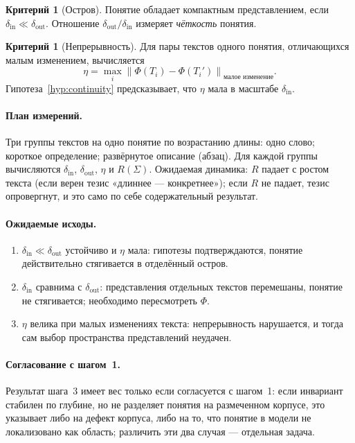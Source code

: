 \documentclass[11pt,a4paper]{article}
\theoremstyle{definition}
\newtheorem{criterion}[definition]{Критерий}
\theoremstyle{plain}
\newcommand{\norm}[1]{\left\lVert #1 \right\rVert}
\begin{document}
\begin{criterion}[Остров]
Понятие обладает компактным представлением, если $\delta_{\mathrm{in}}\ll\delta_{\mathrm{out}}$.
Отношение $\delta_{\mathrm{out}}/\delta_{\mathrm{in}}$ измеряет \emph{чёткость} понятия.
\end{criterion}

\begin{criterion}[Непрерывность]
Для пары текстов одного понятия, отличающихся малым изменением, вычисляется
\[
\eta=\max_{i}\norm{\Phi(T_i)-\Phi(T_i')}_{\text{малое изменение}}.
\]
Гипотеза~\ref{hyp:continuity} предсказывает, что $\eta$ мала в масштабе $\delta_{\mathrm{in}}$.
\end{criterion}

\paragraph{План измерений.}
Три группы текстов на одно понятие по возрастанию длины: одно слово; короткое определение;
развёрнутое описание (абзац). Для каждой группы вычисляются $\delta_{\mathrm{in}}$,
$\delta_{\mathrm{out}}$, $\eta$ и $R(\Sigma)$. Ожидаемая динамика: $R$ падает с ростом текста
(если верен тезис «длиннее — конкретнее»); если $R$ не падает, тезис опровергнут, и это само по
себе содержательный результат.

\paragraph{Ожидаемые исходы.}
\begin{enumerate}[label=(\alph*)]
\item $\delta_{\mathrm{in}}\ll\delta_{\mathrm{out}}$ устойчиво и $\eta$ мала: гипотезы
подтверждаются, понятие действительно стягивается в отделённый остров.
\item $\delta_{\mathrm{in}}$ сравнима с $\delta_{\mathrm{out}}$: представления отдельных текстов
перемешаны, понятие не стягивается; необходимо пересмотреть $\Phi$.
\item $\eta$ велика при малых изменениях текста: непрерывность нарушается, и тогда сам выбор
пространства представлений неудачен.
\end{enumerate}

\paragraph{Согласование с шагом~1.} Результат шага~3 имеет вес только если согласуется с
шагом~1: если инвариант стабилен по глубине, но не разделяет понятия на размеченном корпусе,
это указывает либо на дефект корпуса, либо на то, что понятие в модели не локализовано как
область; различить эти два случая — отдельная задача.
\end{document}
